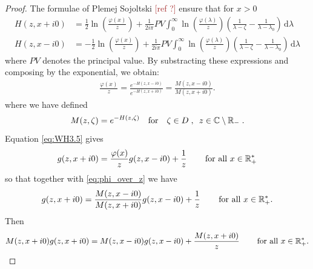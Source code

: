 \documentclass[11pt]{amsart}
\newcommand{\cte}{}
\newcommand{\diff}{\,\mathrm{d}}
\newcommand{\ndr}[1]{\textcolor{brown}{[#1]}}
\begin{document}
\begin{proof}
The formulae of Plemej Sojoltski \ndr{ref ?} ensure that for $x > 0$
    \begin{align*}
        H(z,x+i0) &= \frac{1}{2} \ln\left(\frac{\varphi(x)}{z}\right) + \frac{1}{2i\pi } PV\int_0^\infty \ln\left(\frac{\varphi(\lambda)}{z}\right) \left( \frac{1}{\lambda-\zeta} - \frac{1}{\lambda-\lambda_0}\right) \diff \lambda\\
        H(z,x-i0) &= -\frac{1}{2} \ln\left(\frac{\varphi(x)}{z}\right) + \frac{1}{2i\pi } PV\int_0^\infty \ln\left(\frac{\varphi(\lambda)}{z}\right)\left( \frac{1}{\lambda-\zeta} - \frac{1}{\lambda-\lambda_0}\right) \diff \lambda
    \end{align*}
where $PV$ denotes the principal value. 
By substracting these expressions and composing by the exponential, we obtain:
\begin{align}
    \label{eq:phi_over_z}
    \frac{\varphi(x)}{z}
    = \frac{e^{-H(z,x-i0)}}{e^{-H(z,x+i0)}} 
    = \frac{M(z,x-i0)}{M(z,x+i0)}.
\end{align}
where we have defined
\begin{equation}
    M(z,\zeta) = e^{-H(z,\zeta)}
    \quad \text{for} \quad
    \zeta \in D
    \; , \enspace z \in \mathbb{C} \setminus \mathbb{R}_- \; .
    \label{def:M}
\end{equation}
Equation \eqref{eq:WH3.5} gives
\begin{align*}
    g(z, x+i0) = \frac{\varphi(x)}{z} g(z, x-i0) + \frac{1}{z} \, \qquad \text{for all $x\in\mathbb{R}_+^*$}
\end{align*}
so that together with \eqref{eq:phi_over_z} we have
\begin{align*}
    g(z, x+i0) = \frac{M(z,x-i0)}{M(z,x+i0)} g(z, x-i0) + \frac{1}{z} \, \qquad \text{for all $x\in\mathbb{R}_+^*$}.
\end{align*}
Then 
\begin{align*}
    M(z,x+i0)g(z, x+i0) = M(z,x-i0)g(z, x-i0) + \frac{M(z,x+i0)}{\cte  z} \, \qquad \text{for all $x\in\RR_+^*$}.
\end{align*}


\end{proof}
\end{document}

